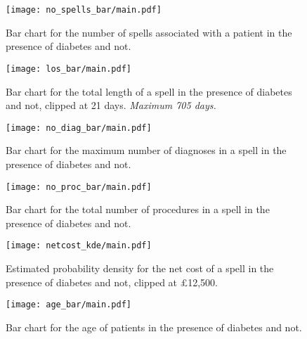 \begin{figure}[htbp]
    \centering
    \texttt{[image: no\_spells\_bar/main.pdf]}
    \caption{Bar chart for the number of spells associated with a patient in the
        presence of diabetes and not.}%
    \label{fig:diabetes_no_spells_bar}
\end{figure}

\begin{figure}[htbp]
    \texttt{[image: los\_bar/main.pdf]}
    \caption{Bar chart for the total length of a spell in the presence of
        diabetes and not, clipped at 21 days. \textit{Maximum 705 days.}}%
    \label{fig:diabetes_los_bar}
\end{figure}

\begin{figure}[htbp]
    \centering
    \texttt{[image: no\_diag\_bar/main.pdf]}
    \caption{Bar chart for the maximum number of diagnoses in a spell in the
        presence of diabetes and not.}%
    \label{fig:diabetes_no_diag_bar}
\end{figure}

\begin{figure}[htbp]
    \centering
    \texttt{[image: no\_proc\_bar/main.pdf]}
    \caption{Bar chart for the total number of procedures in a spell in the
        presence of diabetes and not.}%
    \label{fig:diabetes_no_proc_bar}
\end{figure}

\begin{figure}[htbp]
    \centering
    \texttt{[image: netcost\_kde/main.pdf]}
    \caption{Estimated probability density for the net cost of a spell in the
        presence of diabetes and not, clipped at \pounds12,500.}%
    \label{fig:diabetes_netcost_kde}
\end{figure}

\begin{figure}[htbp]
    \centering
    \texttt{[image: age\_bar/main.pdf]}
    \caption{Bar chart for the age of patients in the presence of diabetes and
        not.}%
    \label{fig:diabetes_age_bar}
\end{figure}

